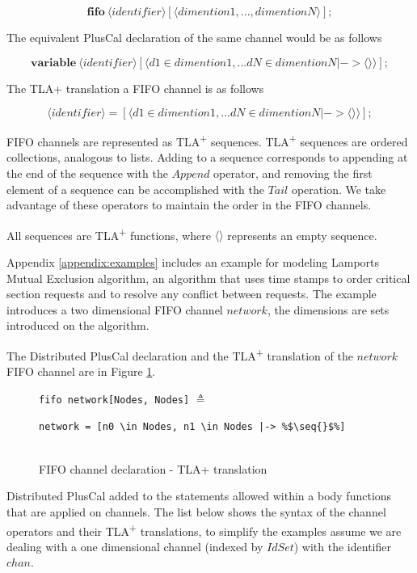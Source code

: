\documentclass{thesul}
\newcommand{\tlaplus}{TLA\textsuperscript{+}\xspace}
\newcommand{\seq}[1]{\langle #1 \rangle}
\newcommand{\keyword}[1]{\textbf{#1}}
\newcommand{\entity}[1]{\ensuremath{\langle}#1\ensuremath{\rangle}}
\begin{document}
\[
 \keyword{fifo}\ \entity{identifier}[\entity{dimention1,...,dimentionN}];
\]

The equivalent PlusCal declaration of the same channel would be as follows

\[
 \keyword{variable}\ \entity{identifier}[\entity{d1 \in dimention1,... dN \in dimentionN |-> \seq{}}];
\]

The TLA+ translation a FIFO channel is as follows

\[
 \entity{identifier} = [\entity{d1 \in dimention1,... dN \in dimentionN |-> \seq{}}];
\]


FIFO channels are represented as \tlaplus sequences.
\tlaplus sequences are ordered collections, analogous to lists. Adding to a sequence corresponds to appending at the end of the sequence with the $Append$ operator, and removing the first element of a sequence can be accomplished with the $Tail$ operation. We take advantage of these operators to maintain the order in the FIFO channels.

All sequences are \tlaplus functions, where $\seq{}$ represents an empty sequence.

Appendix \ref{appendix:examples} includes an example for  modeling Lamports Mutual Exclusion algorithm, an algorithm that uses time stamps to order critical section requests and to resolve any conflict between requests. The example introduces a two dimensional FIFO channel $network$, the dimensions are sets introduced on the algorithm.

The Distributed PlusCal declaration and the \tlaplus translation of the $network$ FIFO channel are in Figure \ref{fifochannels}.
 

\FloatBarrier
\begin{figure}[!h]
\begin{minipage}{.3\textwidth}

\lstinline|fifo network[Nodes, Nodes]| $\triangleq$ 
\end{minipage}\hfill
\begin{minipage}{.7\textwidth}
\begin{lstlisting}[escapechar=\%, frame = none, numbers = none]
network = [n0 \in Nodes, n1 \in Nodes |-> %$\seq{}$%]
  
\end{lstlisting}  
\end{minipage}\hfill
\caption{FIFO channel declaration - TLA+ translation}
\label{fifochannels}
\end{figure}
\FloatBarrier


Distributed PlusCal added to the statements allowed within a body functions that are applied on channels.
The list below shows the syntax of the channel operators and their \tlaplus translations, to simplify the examples assume we are dealing with a one dimensional channel (indexed by $IdSet$) with the identifier $chan$.
\end{document}
